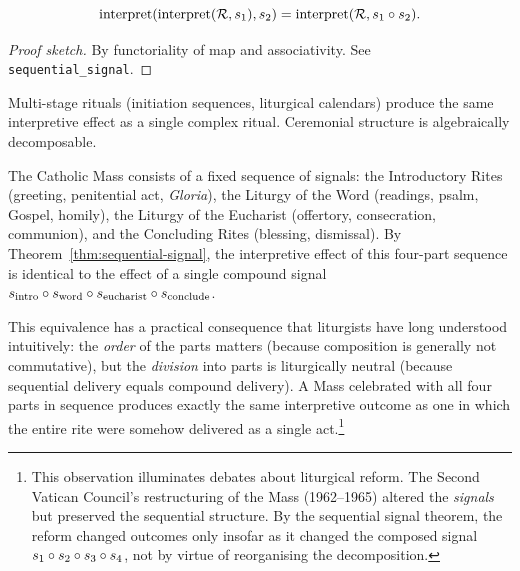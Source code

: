 \begin{theorem}
\label{thm:sequential-signal}
\[
  \operatorname{interpret}(\operatorname{interpret}(\mathcal{R}, s_1), s_2)
  = \operatorname{interpret}(\mathcal{R}, s_1 \circ s_2).
\]
\end{theorem}

\begin{proof}[Proof sketch]
By functoriality of map and associativity.
See \texttt{sequential\_signal}.
\end{proof}

\begin{remark}
Multi-stage rituals (initiation sequences, liturgical calendars) produce
the same interpretive effect as a single complex ritual.  Ceremonial
structure is algebraically decomposable.
\end{remark}

\begin{example}
\label{ex:catholic-mass}
The Catholic Mass consists of a fixed sequence of signals: the
Introductory Rites (greeting, penitential act, \emph{Gloria}), the
Liturgy of the Word (readings, psalm, Gospel, homily), the Liturgy of
the Eucharist (offertory, consecration, communion), and the Concluding
Rites (blessing, dismissal).  By Theorem~\ref{thm:sequential-signal},
the interpretive effect of this four-part sequence is identical to
the effect of a single compound signal $s_{\text{intro}} \circ
s_{\text{word}} \circ s_{\text{eucharist}} \circ s_{\text{conclude}}$.

This equivalence has a practical consequence that liturgists have long
understood intuitively: the \emph{order} of the parts matters (because
composition is generally not commutative), but the \emph{division} into
parts is liturgically neutral (because sequential delivery equals
compound delivery).  A Mass celebrated with all four parts in sequence
produces exactly the same interpretive outcome as one in which the
entire rite were somehow delivered as a single act.\footnote{This
observation illuminates debates about liturgical reform.  The Second
Vatican Council's restructuring of the Mass (1962--1965) altered the
\emph{signals} but preserved the sequential structure.  By the
sequential signal theorem, the reform changed outcomes only insofar
as it changed the composed signal $s_1 \circ s_2 \circ s_3
\circ s_4$, not by virtue of reorganising the decomposition.}
\end{example}

